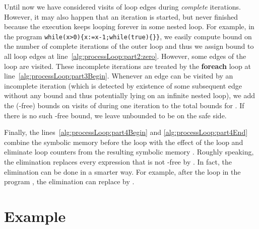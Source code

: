 \documentclass[10pt,a4paper]{article}
\begin{document}

Until now we have considered visits of loop edges during \emph{complete}
iterations. However, it may also happen that an iteration is started, but
never finished because the execution keeps looping forever in some nested
loop. For example, in the program
\texttt{while(x>0)\{x:=x-1;while(true)\{\}\}}, we easily compute bound 
on the number of complete iterations of the outer loop and thus we assign
bound  to all loop edges at
line~\ref{alg:processLoop:part2:zero}. However, some edges of the loop are
visited. These incomplete iterations are treated by the \textbf{foreach}
loop at line~\ref{alg:processLoop:part3Begin}. Whenever an edge  can be
visited by an incomplete iteration (which is detected by existence of some
subsequent edge  without any bound and thus potentially lying on an
infinite nested loop), we add the (-free) bounds on visits of
 during one iteration to the total bounds for . If there is no such
-free bound, we leave  unbounded to be on the safe side.

Finally, the lines~\ref{alg:processLoop:part4Begin} and
\ref{alg:processLoop:part4End} combine the symbolic memory before the loop
with the effect of the loop and eliminate loop counters from the resulting
symbolic memory . Roughly speaking, the elimination
replaces every expression that is not -free by . In
fact, the elimination can be done in a smarter way. For example, after the
loop in the program , the elimination
can replace  by . 






\section{Example}\label{sec:example}
\end{document}
